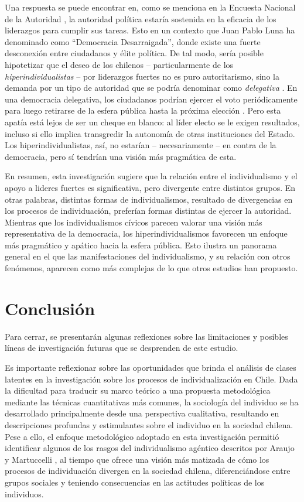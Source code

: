 \documentclass[12pt,twoside]{templates/facsothesis}
\begin{document}
Una respuesta se puede encontrar en, como se menciona en la Encuesta Nacional de la Autoridad \citep{araujo2022}, la autoridad política estaría sostenida en la eficacia de los liderazgos para cumplir sus tareas. Esto en un contexto que Juan Pablo Luna \citeyearpar{luna2016} ha denominado como ``Democracia Desarraigada'', donde existe una fuerte desconexión entre ciudadanos y élite política. De tal modo, sería posible hipotetizar que el deseo de los chilenos -- particularmente de los \emph{hiperindividualistas} -- por liderazgos fuertes no es puro autoritarismo, sino la demanda por un tipo de autoridad que se podría denominar como \emph{delegativa} \citep{odonnell1994}. En una democracia delegativa, los ciudadanos podrían ejercer el voto periódicamente para luego retirarse de la esfera pública hasta la próxima elección \citep{peruzzotti2008}. Pero esta apatía está lejos de ser un cheque en blanco: al líder electo se le exigen resultados, incluso si ello implica transgredir la autonomía de otras instituciones del Estado. Los hiperindividualistas, así, no estarían -- necesariamente -- en contra de la democracia, pero sí tendrían una visión más pragmática de esta.

En resumen, esta investigación sugiere que la relación entre el individualismo y el apoyo a lideres fuertes es significativa, pero divergente entre distintos grupos. En otras palabras, distintas formas de individualismos, resultado de divergencias en los procesos de individuación, preferían formas distintas de ejercer la autoridad. Mientras que los individualismos cívicos parecen valorar una visión más representativa de la democracia, los hiperindividualismos favorecen un enfoque más pragmático y apático hacia la esfera pública. Esto ilustra un panorama general en el que las manifestaciones del individualismo, y su relación con otros fenómenos, aparecen como más complejas de lo que otros estudios han propuesto.

\hypertarget{conclusiuxf3n}{%
\chapter{Conclusión}\label{conclusiuxf3n}}

Para cerrar, se presentarán algunas reflexiones sobre las limitaciones y posibles líneas de investigación futuras que se desprenden de este estudio.

Es importante reflexionar sobre las oportunidades que brinda el análisis de clases latentes en la investigación sobre los procesos de individualización en Chile. Dada la dificultad para traducir su marco teórico a una propuesta metodológica mediante las técnicas cuantitativas más comunes, la sociología del individuo se ha desarrollado principalmente desde una perspectiva cualitativa, resultando en descripciones profundas y estimulantes sobre el individuo en la sociedad chilena. Pese a ello, el enfoque metodológico adoptado en esta investigación permitió identificar algunos de los rasgos del individualismo agéntico descritos por Araujo y Martuccelli \citeyearpar{araujo2014}, al tiempo que ofrece una visión más matizada de cómo los procesos de individuación divergen en la sociedad chilena, diferenciándose entre grupos sociales y teniendo consecuencias en las actitudes políticas de los individuos.
\end{document}
